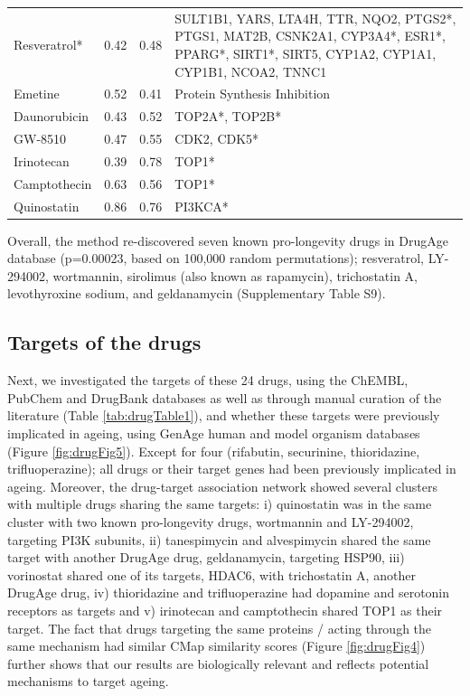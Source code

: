 \documentclass[12pt,twoside]{unicam}
\begin{document}
\begin{longtable}[t]{lrr>{\raggedright\arraybackslash}p{6cm}}
Resveratrol* & 0.42 & 0.48 & SULT1B1, YARS, LTA4H, TTR, NQO2, PTGS2*, PTGS1, MAT2B, CSNK2A1, CYP3A4*, ESR1*, PPARG*, SIRT1*, SIRT5, CYP1A2, CYP1A1, CYP1B1, NCOA2, TNNC1\\
\rowcolor{gray!6}  Emetine & 0.52 & 0.41 & Protein Synthesis Inhibition\\
Daunorubicin & 0.43 & 0.52 & TOP2A*, TOP2B*\\
\addlinespace
\rowcolor{gray!6}  GW-8510 & 0.47 & 0.55 & CDK2, CDK5*\\
Irinotecan & 0.39 & 0.78 & TOP1*\\
\rowcolor{gray!6}  Camptothecin & 0.63 & 0.56 & TOP1*\\
Quinostatin & 0.86 & 0.76 & PI3KCA*\\
\bottomrule
\end{longtable}

Overall, the method re-discovered seven known pro-longevity drugs in DrugAge database (p=0.00023, based on 100,000 random permutations); resveratrol, LY-294002, wortmannin, sirolimus (also known as rapamycin), trichostatin A, levothyroxine sodium, and geldanamycin (Supplementary Table S9).

\hypertarget{targets-of-the-drugs}{%
\subsection{Targets of the drugs}\label{targets-of-the-drugs}}

Next, we investigated the targets of these 24 drugs, using the ChEMBL, PubChem and DrugBank databases as well as through manual curation of the literature (Table \ref{tab:drugTable1}), and whether these targets were previously implicated in ageing, using GenAge human and model organism databases (Figure \ref{fig:drugFig5}). Except for four (rifabutin, securinine, thioridazine, trifluoperazine); all drugs or their target genes had been previously implicated in ageing. Moreover, the drug-target association network showed several clusters with multiple drugs sharing the same targets: i) quinostatin was in the same cluster with two known pro-longevity drugs, wortmannin and LY-294002, targeting PI3K subunits, ii) tanespimycin and alvespimycin shared the same target with another DrugAge drug, geldanamycin, targeting HSP90, iii) vorinostat shared one of its targets, HDAC6, with trichostatin A, another DrugAge drug, iv) thioridazine and trifluoperazine had dopamine and serotonin receptors as targets and v) irinotecan and camptothecin shared TOP1 as their target. The fact that drugs targeting the same proteins / acting through the same mechanism had similar CMap similarity scores (Figure \ref{fig:drugFig4}) further shows that our results are biologically relevant and reflects potential mechanisms to target ageing.
\end{document}
